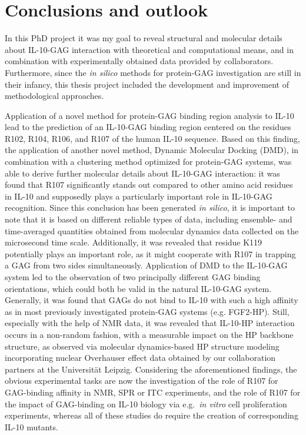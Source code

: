 \chapter{Conclusions and outlook}

In this PhD project it was my goal to reveal structural and molecular details
about IL-10-GAG interaction with theoretical and computational means, and in
combination with experimentally obtained data provided by collaborators.
Furthermore, since the \textit{in silico} methods for protein-GAG investigation
are still in their infancy, this thesis project included the development and
improvement of methodological approaches.

Application of a novel method for protein-GAG binding region analysis to IL-10
lead to the prediction of an IL-10-GAG binding region centered on the residues
R102, R104, R106, and R107 of the human IL-10 sequence. Based on this finding,
the application of another novel method, Dynamic Molecular Docking (DMD), in
combination with a clustering method optimized for protein-GAG systems, was able
to derive further molecular details about IL-10-GAG interaction: it was found
that R107 significantly stands out compared to other amino acid residues in
IL-10 and supposedly plays a particularly important role in IL-10-GAG
recognition. Since this conclusion has been generated \textit{in silico}, it is
important to note that it is based on different reliable types of data,
including ensemble- and time-averaged quantities obtained from molecular
dynamics data collected on the microsecond time scale. Additionally, it was
revealed that residue K119 potentially plays an important role, as it might
cooperate with R107 in trapping a GAG from two sides simultaneously. Application
of DMD to the IL-10-GAG system led to the observation of two principally
different GAG binding orientations, which could both be valid in the natural
IL-10-GAG system. Generally, it was found that GAGs do not bind to IL-10 with
such a high affinity as in most previously investigated protein-GAG systems
(e.g. FGF2-HP). Still, especially with the help of NMR data, it was revealed
that IL-10-HP interaction occurs in a non-random fashion, with a measurable
impact on the HP backbone structure, as observed via molecular dynamics-based HP
structure modeling incorporating nuclear Overhauser effect data obtained by our
collaboration partners at the Universität Leipzig. Considering the
aforementioned findings, the obvious experimental tasks are now the
investigation of the role of R107 for GAG-binding affinity in NMR, SPR or ITC
experiments, and the role of R107 for the impact of GAG-binding on IL-10 biology
via e.g.\ \textit{in vitro} cell proliferation experiments, whereas all of these
studies do require the creation of corresponding IL-10 mutants.

